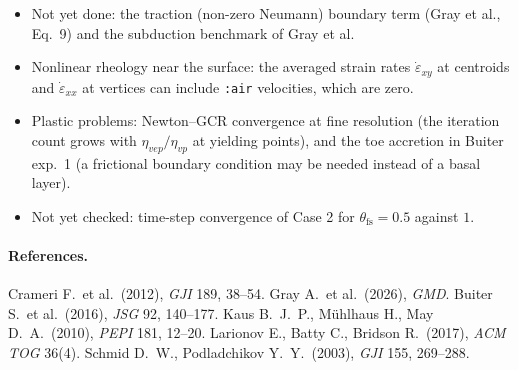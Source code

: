 \documentclass[11pt,a4paper]{article}
\begin{document}
\begin{itemize}
\item Not yet done: the traction (non-zero Neumann) boundary term (Gray et al., Eq.~9) and the subduction benchmark of Gray et al.
\item Nonlinear rheology near the surface: the averaged strain rates $\dot\varepsilon_{xy}$ at centroids and $\dot\varepsilon_{xx}$ at vertices can include \texttt{:air} velocities, which are zero.
\item Plastic problems: Newton--GCR convergence at fine resolution (the iteration count grows with $\eta_{vep}/\eta_{vp}$ at yielding points), and the toe accretion in Buiter exp.~1 (a frictional boundary condition may be needed instead of a basal layer).
\item Not yet checked: time-step convergence of Case 2 for $\theta_\mathrm{fs}=0.5$ against $1$.
\end{itemize}

\paragraph{References.}
{\footnotesize
Crameri F.\ et al.\ (2012), \emph{GJI} 189, 38--54.
Gray A.\ et al.\ (2026), \emph{GMD}.
Buiter S.\ et al.\ (2016), \emph{JSG} 92, 140--177.
Kaus B.\ J.\ P., M\"uhlhaus H., May D.\ A.\ (2010), \emph{PEPI} 181, 12--20.
Larionov E., Batty C., Bridson R.\ (2017), \emph{ACM TOG} 36(4).
Schmid D.\ W., Podladchikov Y.\ Y.\ (2003), \emph{GJI} 155, 269--288.
}
\end{document}
